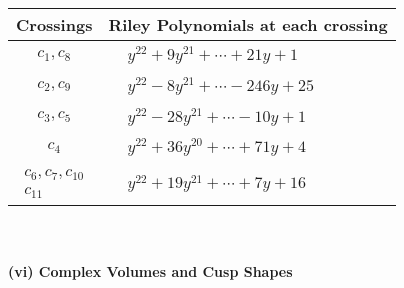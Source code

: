 \documentclass[1p]{elsarticle_modified}
\theoremstyle{definition}
\begin{document}
\begin{tabular}{m{50pt}|m{274pt}}
Crossings & \hspace{64pt}Riley Polynomials at each crossing \\
\hline $$\begin{aligned}c_{1},c_{8}\end{aligned}$$&$\begin{aligned}
&y^{22}+9 y^{21}+\cdots+21 y+1
\end{aligned}$\\
\hline $$\begin{aligned}c_{2},c_{9}\end{aligned}$$&$\begin{aligned}
&y^{22}-8 y^{21}+\cdots-246 y+25
\end{aligned}$\\
\hline $$\begin{aligned}c_{3},c_{5}\end{aligned}$$&$\begin{aligned}
&y^{22}-28 y^{21}+\cdots-10 y+1
\end{aligned}$\\
\hline $$\begin{aligned}c_{4}\end{aligned}$$&$\begin{aligned}
&y^{22}+36 y^{20}+\cdots+71 y+4
\end{aligned}$\\
\hline $$\begin{aligned}c_{6},c_{7},c_{10}\\c_{11}\end{aligned}$$&$\begin{aligned}
&y^{22}+19 y^{21}+\cdots+7 y+16
\end{aligned}$\\
\hline
\end{tabular}\\~\\
\newpage\flushleft \textbf{(vi) Complex Volumes and Cusp Shapes}
\end{document}
